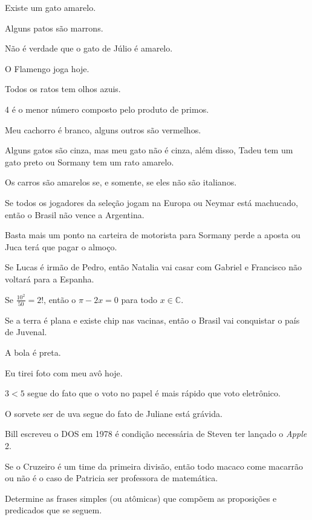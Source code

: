 \begin{exerList}
 \item Existe um gato amarelo.
 \item Alguns patos são marrons.
 \item Não é verdade que o gato de Júlio é amarelo.
 \item O Flamengo joga hoje.
 \item Todos os ratos tem olhos azuis.
 \item 4 é o menor número composto pelo produto de primos.
 \item Meu cachorro é branco, alguns outros são vermelhos.
 \item Alguns gatos são cinza, mas meu gato não é cinza, além disso, Tadeu tem um gato preto ou Sormany tem um rato amarelo.
 \item Os carros são amarelos se, e somente, se eles não são italianos.
 \item Se todos os jogadores da seleção jogam na Europa ou Neymar está machucado, então o Brasil não vence a Argentina.
 \item Basta mais um ponto na carteira de motorista para Sormany perde a aposta ou Juca terá que pagar o almoço.
 \item Se Lucas é irmão de Pedro, então Natalia vai casar com Gabriel e Francisco não voltará para a Espanha.
 \item Se $\frac{10^2}{50} = 2!$, então o $\pi - 2x = 0$ para todo $x \in \mathbb{C}$.
 \item Se a terra é plana e existe chip nas vacinas, então o Brasil vai conquistar o país de Juvenal. 
 \item A bola é preta.
 \item Eu tirei foto com meu avô hoje.
 \item $3 < 5$ segue do fato que o  voto no papel é mais rápido que voto eletrônico.
 \item O sorvete ser de uva segue do fato de Juliane está grávida.
 \item Bill escreveu o DOS em 1978 é condição necessária de Steven ter lançado o \textit{Apple} 2.
 \item Se o Cruzeiro é um time da primeira divisão, então todo macaco come macarrão ou não é o caso de Patricia ser professora de matemática. 
\end{exerList}

\begin{questao}
 Determine as frases simples (ou atômicas) que compõem as proposições e predicados que se seguem.
\end{questao}

